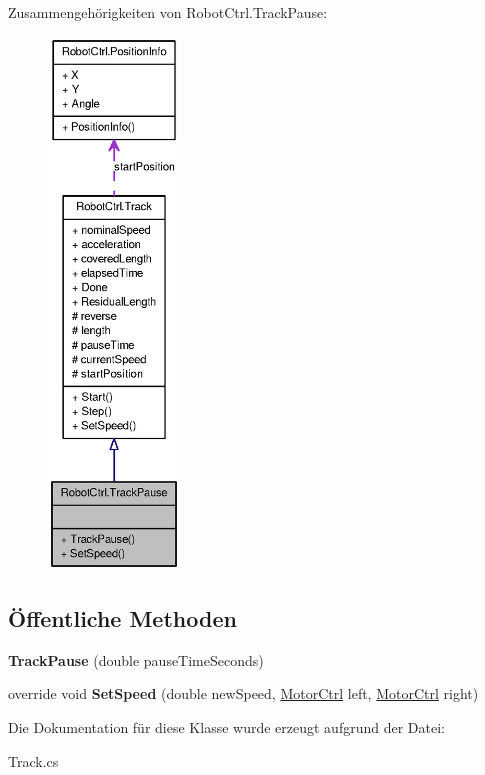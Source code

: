 Zusammengehörigkeiten von RobotCtrl.TrackPause:\nopagebreak
\begin{figure}[H]
\begin{center}
\leavevmode
\includegraphics[height=400pt]{class_robot_ctrl_1_1_track_pause__coll__graph}
\end{center}
\end{figure}
\subsection*{Öffentliche Methoden}
\begin{DoxyCompactItemize}
\item 
\hypertarget{class_robot_ctrl_1_1_track_pause_ab869a1e5eb8a5db402ad7a7515700688}{
{\bfseries TrackPause} (double pauseTimeSeconds)}
\label{class_robot_ctrl_1_1_track_pause_ab869a1e5eb8a5db402ad7a7515700688}

\item 
\hypertarget{class_robot_ctrl_1_1_track_pause_a47133c69e455aa2c04f1bc3a6b5999b6}{
override void {\bfseries SetSpeed} (double newSpeed, \hyperlink{class_robot_ctrl_1_1_motor_ctrl}{MotorCtrl} left, \hyperlink{class_robot_ctrl_1_1_motor_ctrl}{MotorCtrl} right)}
\label{class_robot_ctrl_1_1_track_pause_a47133c69e455aa2c04f1bc3a6b5999b6}

\end{DoxyCompactItemize}


Die Dokumentation für diese Klasse wurde erzeugt aufgrund der Datei:\begin{DoxyCompactItemize}
\item 
Track.cs\end{DoxyCompactItemize}

